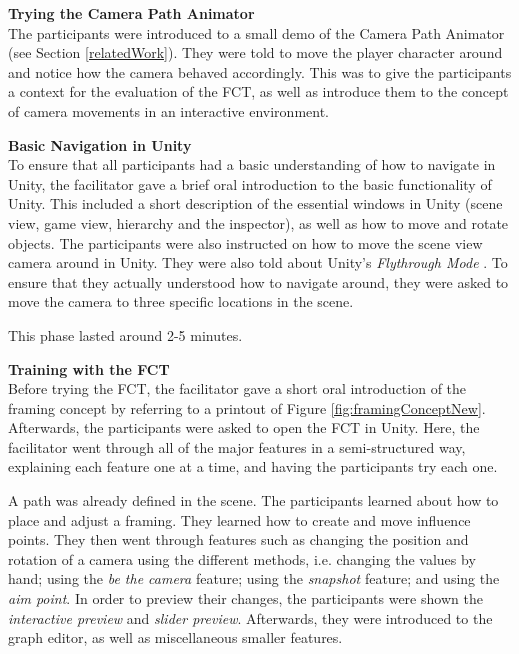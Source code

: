 \textbf{Trying the Camera Path Animator}\\
The participants were introduced to a small demo of the Camera Path Animator \cite{unity_camTool} (see Section \ref{relatedWork}). They were told to move the player character around and notice how the camera behaved accordingly. This was to give the participants a context for the evaluation of the FCT, as well as introduce them to the concept of camera movements in an interactive environment.




\textbf{Basic Navigation in Unity}\\
To ensure that all participants had a basic understanding of how to navigate in Unity, the facilitator gave a brief oral introduction to the basic functionality of Unity. This included a short description of the essential windows in Unity (scene view, game view, hierarchy and the inspector), as well as how to move and rotate objects. The participants were also instructed on how to move the scene view camera around in Unity. They were also told about Unity's \textit{Flythrough Mode} \cite{unity_flyMode}. To ensure that they actually understood how to navigate around, they were asked to move the camera to three specific locations in the scene. 


This phase lasted around 2-5 minutes.

\textbf{Training with the FCT}\\
Before trying the FCT, the facilitator gave a short oral introduction of the framing concept by referring to a printout of Figure \ref{fig:framingConceptNew}. Afterwards, the participants were asked to open the FCT in Unity. Here, the facilitator went through all of the major features in a semi-structured way, explaining each feature one at a time, and having the participants try each one.

A path was already defined in the scene. The participants learned about how to place and adjust a framing. They learned how to create and move influence points. They then went through features such as changing the position and rotation of a camera using the different methods, i.e. changing the values by hand; using the \textit{be the camera} feature; using the \textit{snapshot} feature; and using the \textit{aim point}. In order to preview their changes, the participants were shown the \textit{interactive preview} and \textit{slider preview}. Afterwards, they were introduced to the graph editor, as well as miscellaneous smaller features.

